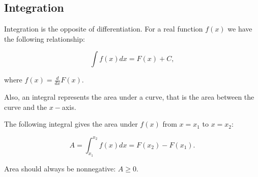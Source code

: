 \documentclass[a4paper,11pt]{article}
\begin{document}
\subsection{Integration}
Integration is the opposite of differentiation. For a real function $f(x)$ we have the following relationship:

\begin{equation}
\int f(x)dx=F(x)+C,
\end{equation}

where $f(x)=\frac{d}{dx} F(x)$.

Also, an integral represents the area under a curve, that is the area between the curve and the  $x-$axis.

The following integral gives the area under $f(x)$ from $x = x_1$ to $x = x_2$:

\begin{equation}
A=\int ^{x_2}_{x_1}f(x)dx=F(x_2)-F(x_1).
\end{equation}

Area should always be nonnegative: $A \geq 0$.
\end{document}
